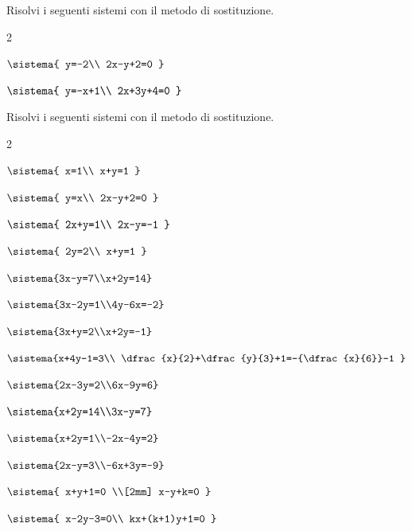 \begin{esercizio}
 \label{ese:22.7}
Risolvi i seguenti sistemi con il metodo di sostituzione.
 \begin{htmulticols}{2}
 \begin{enumeratea}
  \item \(\sistema{
     y=-2\\
     2x-y+2=0
    }\)
  \item \(\sistema{
	   y=-x+1\\
	   2x+3y+4=0
       }\)
 \end{enumeratea}
 \end{htmulticols}
\end{esercizio}

\begin{esercizio}[*]
 \label{ese:22.8}
Risolvi i seguenti sistemi con il metodo di sostituzione.
 \begin{htmulticols}{2}
 \begin{enumeratea}
  \item \(\sistema{
        x=1\\
        x+y=1
       }\) 
\item \(\sistema{
        y=x\\
        2x-y+2=0
       }\) 
\item \(\sistema{
  2x+y=1\\
  2x-y=-1
	  }\) 
\item \(\sistema{
	   2y=2\\
	   x+y=1
	}\) 
\item \(\sistema{3x-y=7\\x+2y=14}\) 
\item \(\sistema{3x-2y=1\\4y-6x=-2}\) 
\item \(\sistema{3x+y=2\\x+2y=-1}\) 
\item \(\sistema{x+4y-1=3\\
	\dfrac{x}{2}+\dfrac{y}{3}+1=-{\dfrac{x}{6}}-1
	}\) 
  \item \(\sistema{2x-3y=2\\6x-9y=6}\)
\item \(\sistema{x+2y=14\\3x-y=7}\)
\item \(\sistema{x+2y=1\\-2x-4y=2}\)
\item \(\sistema{2x-y=3\\-6x+3y=-9}\)
  \item \(\sistema{
  x+y+1=0 \\[2mm]
  x-y+k=0 }\)
\item \(\sistema{
x-2y-3=0\\
kx+(k+1)y+1=0 }\)
 \end{enumeratea}
 \end{htmulticols}
\end{esercizio}

